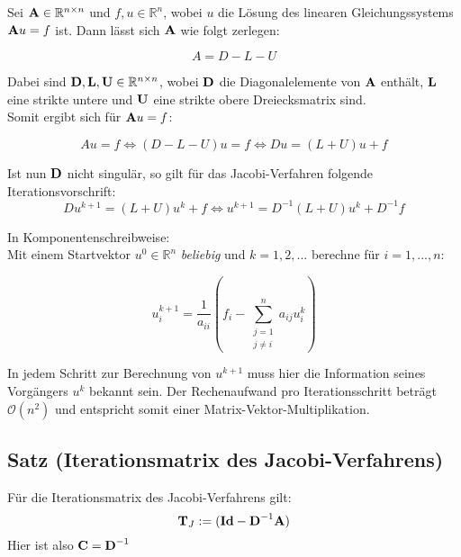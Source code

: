 Sei ${\textbf{A}} \in \mathbb{R}^{n \times n}$ und $f,u \in \mathbb{R}^{n}$, wobei $u$ die Lösung des linearen Gleichungssystems ${\textbf{A}}u = f$ ist. Dann lässt sich ${\textbf{A}}$ wie folgt zerlegen:

\begin{equation}
A = D - L - U
\end{equation}

Dabei sind ${\textbf{D}},{\textbf{L}},{\textbf{U}} \in \mathbb{R}^{n \times n}$, wobei ${\textbf{D}}$ die Diagonalelemente von ${\textbf{A}}$ enthält, ${\textbf{L}}$ eine strikte untere und ${\textbf{U}}$ eine strikte obere Dreiecksmatrix sind. \\
Somit ergibt sich für ${\textbf{A}}u = f$:

\begin{equation}
Au = f \Leftrightarrow (D-L-U)u = f \Leftrightarrow Du = (L+U)u + f
\end{equation}

Ist nun ${\textbf{D}}$ nicht singulär, so gilt für das Jacobi-Verfahren folgende Iterationsvorschrift:
\begin{equation}
Du^{k+1} = (L+U)u^{k} + f \Leftrightarrow u^{k+1} = D^{-1}(L+U)u^{k} + D^{-1}f
\end{equation}

In Komponentenschreibweise: \\
Mit einem Startvektor $u^{0} \in \mathbb{R}^{n}$ \textit{beliebig} und $k=1,2,...$ berechne für $i=1,...,n$:

\begin{equation}
u^{k+1}_{i} = \frac {1} {a_{ii}} (f_{i} - \sum_{\substack{j = 1 \\ j \ne i}}^{n} a_{ij}u^{k}_{i})
\end{equation}

In jedem Schritt zur Berechnung von $u^{k+1}$ muss hier die Information seines Vorgängers $u^{k}$ bekannt sein. Der Rechenaufwand pro Iterationsschritt beträgt $\mathcal{O}(n^{2})$ und entspricht somit einer Matrix-Vektor-Multiplikation.

\subsection{Satz (Iterationsmatrix des Jacobi-Verfahrens)}\label{ss.Iterationsmatrix Jacobi}

Für die Iterationsmatrix des Jacobi-Verfahrens gilt:
\begin{equation}
{\textbf{T}}_{J} := ({\textbf{Id}} - {\textbf{D}}^{-1} {\textbf{A}})
\end{equation}
Hier ist also ${\textbf{C}} = {\textbf{D}}^{-1}$

